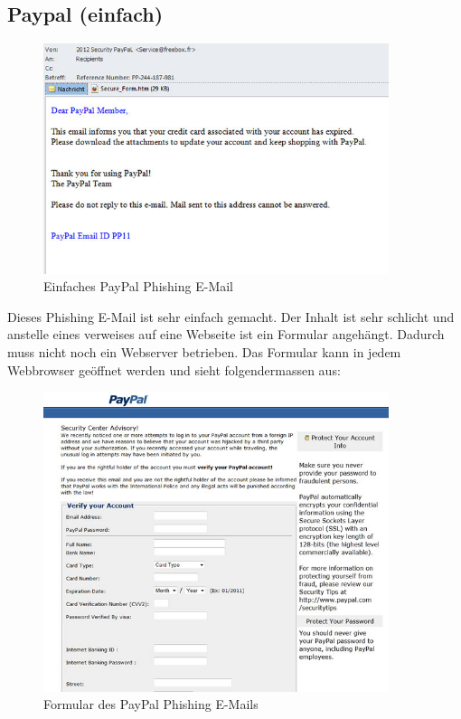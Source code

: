 \subsection{Paypal (einfach)}
\begin{figure}[H]
  \centering
  \includegraphics[width=0.9\textwidth]{images/phishing-beispiel-paypal1.jpg}
  \caption{Einfaches PayPal Phishing E-Mail}
  \label{fig:phishing:beispiele:paypaleinfachmail}
\end{figure}

Dieses Phishing E-Mail ist sehr einfach gemacht. Der Inhalt ist sehr schlicht und anstelle eines verweises auf eine Webseite ist ein Formular angehängt. Dadurch muss nicht noch ein Webserver betrieben. Das Formular kann in jedem Webbrowser geöffnet werden und sieht folgendermassen aus:

\begin{figure}[H]
  \centering
  \includegraphics[width=0.9\textwidth]{images/phishing-beispiel-paypal2.jpg}
  \caption{Formular des PayPal Phishing E-Mails}
  \label{fig:phishing:beispiele:paypaleinfachformular}
\end{figure}

